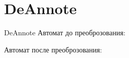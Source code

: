 \section{DeAnnote}
\begin{frame}{DeAnnote}
	Автомат до преоброзования:


	Автомат после преоброзования:

\end{frame}
